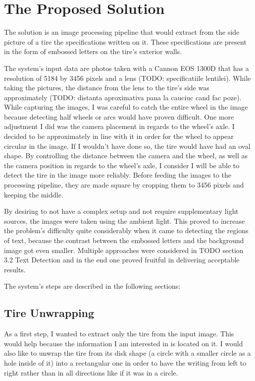 \chapter{The Proposed Solution}\pagestyle{fancy}\setlength{\parindent}{3em}
\label{chap:proposed-solution}

The solution is an image processing pipeline that would extract from the side picture of a tire the specifications written on it. These specifications are present in the form of embossed letters on the tire's exterior walls.

The system's input data are photos taken with a Cannon EOS 1300D that has a resolution of 5184 by 3456 pixels and a lens (TODO: specificatiile lentilei). While taking the pictures, the distance from the lens to the tire's side was approximately (TODO: distanta aproximativa pana la cauciuc cand fac poze). While capturing the images, I was careful to catch the entire wheel in the image because detecting half wheels or arcs would have proven difficult. One more adjustment I did was the camera placement in regards to the wheel's axle. I decided to be approximately in line with it in order for the wheel to appear circular in the image. If I wouldn't have done so, the tire would have had an oval shape. By controlling the distance between the camera and the wheel, as  well as the camera position in regards to the wheel's axle, I consider I will be able to detect the tire in the image more reliably. Before feeding the images to the processing pipeline, they are made square by cropping them to 3456 pixels and keeping the middle.

By desiring to not have a complex setup and not require supplementary light sources, the images were taken using the ambient light. This proved to increase the problem's difficulty quite considerably when it came to detecting the regions of text, because the contrast between the embossed letters and the background image got even smaller. Multiple approaches were considered in TODO section 3.2 Text Detection and in the end one proved fruitful in delivering acceptable results.

The system's steps are described in the following sections:

\section{Tire Unwrapping}\label{sec:tire-unwrapping}

As a first step, I wanted to extract only the tire from the input image. This would help because the information I am interested in is located on it. I would also like to unwrap the tire from its disk shape (a circle with a smaller circle as a hole inside of it) into a rectangular one in order to have the writing from left to right rather than in all directions like if it was in a circle.


